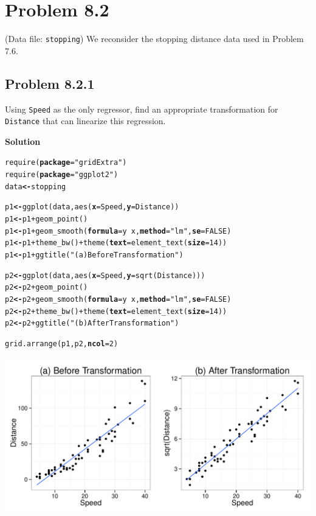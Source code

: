\documentclass[12pt,oneside,a4paper]{article}\usepackage[]{graphicx}\usepackage[]{xcolor}
\makeatletter
\newcommand{\hlnum}[1]{\textcolor[rgb]{0,0,0}{#1}}%
\newcommand{\hlstr}[1]{\textcolor[rgb]{0,0,1}{#1}}%
\newcommand{\hlopt}[1]{\textcolor[rgb]{0,0,0}{#1}}%
\newcommand{\hlstd}[1]{\textcolor[rgb]{0,0,0}{#1}}%
\newcommand{\hlkwb}[1]{\textcolor[rgb]{0.498,0,0.333}{\textbf{#1}}}%
\newcommand{\hlkwc}[1]{\textcolor[rgb]{0.498,0,0.333}{\textbf{#1}}}%
\newcommand{\hlkwd}[1]{\textcolor[rgb]{0,0,0}{#1}}%
\newenvironment{kframe}{%
 \def\at@end@of@kframe{}%
 \ifinner\ifhmode%
  \def\at@end@of@kframe{\end{minipage}}%
  \begin{minipage}{\columnwidth}%
 \fi\fi%
 \def\FrameCommand##1{\hskip\@totalleftmargin \hskip-\fboxsep
 \colorbox{shadecolor}{##1}\hskip-\fboxsep
     \hskip-\linewidth \hskip-\@totalleftmargin \hskip\columnwidth}%
 \MakeFramed {\advance\hsize-\width
   \@totalleftmargin\z@ \linewidth\hsize
   \@setminipage}}%
 {\par\unskip\endMakeFramed%
 \at@end@of@kframe}
\newenvironment{knitrout}{}{} %
\newcommand{\problem}[1]
{
    \clearpage
    \section*{Problem {#1}}
}
\newcommand{\subproblem}[1]
{
    \subsection*{Problem {#1}}
}
\newcommand{\solution}
{
    \vspace{15pt}
    \noindent\ignorespaces\textbf{\large Solution}
}
\newcommand{\m}[1]{\texttt{{#1}}}
\makeatother
\begin{document}
\problem{8.2}
(Data file: \m{stopping}) We reconsider the stopping distance data used in Problem 7.6.

\subproblem{8.2.1}
Using \m{Speed} as the only regressor, find an appropriate transformation for \m{Distance} that can linearize this regression.

\solution
\begin{knitrout}
\color{fgcolor}\begin{kframe}
\begin{alltt}
\hlkwd{require}\hlstd{(}\hlkwc{package} \hlstd{=} \hlstr{"gridExtra"}\hlstd{)}
\hlkwd{require}\hlstd{(}\hlkwc{package} \hlstd{=} \hlstr{"ggplot2"}\hlstd{)}
\hlstd{data} \hlkwb{<-} \hlstd{stopping}

\hlstd{p1} \hlkwb{<-} \hlkwd{ggplot}\hlstd{(data,} \hlkwd{aes}\hlstd{(}\hlkwc{x} \hlstd{= Speed,} \hlkwc{y} \hlstd{= Distance))}
\hlstd{p1} \hlkwb{<-} \hlstd{p1} \hlopt{+} \hlkwd{geom_point}\hlstd{()}
\hlstd{p1} \hlkwb{<-} \hlstd{p1} \hlopt{+} \hlkwd{geom_smooth}\hlstd{(}\hlkwc{formula} \hlstd{= y} \hlopt{~} \hlstd{x,} \hlkwc{method} \hlstd{=} \hlstr{"lm"}\hlstd{,} \hlkwc{se} \hlstd{=} \hlnum{FALSE}\hlstd{)}
\hlstd{p1} \hlkwb{<-} \hlstd{p1} \hlopt{+} \hlkwd{theme_bw}\hlstd{()} \hlopt{+} \hlkwd{theme}\hlstd{(}\hlkwc{text} \hlstd{=} \hlkwd{element_text}\hlstd{(}\hlkwc{size} \hlstd{=} \hlnum{14}\hlstd{))}
\hlstd{p1} \hlkwb{<-} \hlstd{p1} \hlopt{+} \hlkwd{ggtitle}\hlstd{(}\hlstr{"(a) Before Transformation"}\hlstd{)}

\hlstd{p2} \hlkwb{<-} \hlkwd{ggplot}\hlstd{(data,} \hlkwd{aes}\hlstd{(}\hlkwc{x} \hlstd{= Speed,} \hlkwc{y} \hlstd{=} \hlkwd{sqrt}\hlstd{(Distance)))}
\hlstd{p2} \hlkwb{<-} \hlstd{p2} \hlopt{+} \hlkwd{geom_point}\hlstd{()}
\hlstd{p2} \hlkwb{<-} \hlstd{p2} \hlopt{+} \hlkwd{geom_smooth}\hlstd{(}\hlkwc{formula} \hlstd{= y} \hlopt{~} \hlstd{x,} \hlkwc{method} \hlstd{=} \hlstr{"lm"}\hlstd{,} \hlkwc{se} \hlstd{=} \hlnum{FALSE}\hlstd{)}
\hlstd{p2} \hlkwb{<-} \hlstd{p2} \hlopt{+} \hlkwd{theme_bw}\hlstd{()} \hlopt{+} \hlkwd{theme}\hlstd{(}\hlkwc{text} \hlstd{=} \hlkwd{element_text}\hlstd{(}\hlkwc{size} \hlstd{=} \hlnum{14}\hlstd{))}
\hlstd{p2} \hlkwb{<-} \hlstd{p2} \hlopt{+} \hlkwd{ggtitle}\hlstd{(}\hlstr{"(b) After Transformation"}\hlstd{)}

\hlkwd{grid.arrange}\hlstd{(p1, p2,} \hlkwc{ncol}\hlstd{=}\hlnum{2}\hlstd{)}
\end{alltt}
\end{kframe}

{\centering \includegraphics[width=.9\linewidth]{figure/p821} 

}
\end{knitrout}
\end{document}
